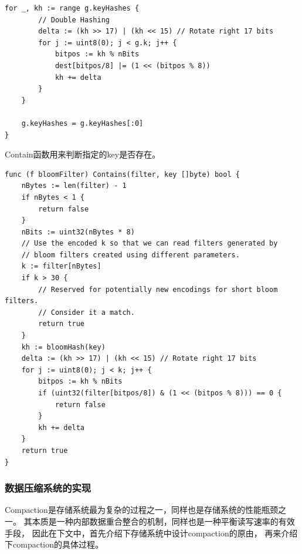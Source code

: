 \begin{enumerate}
\begin{lstlisting}[caption=Generate , label=code_radds_storage_Generate]
	for _, kh := range g.keyHashes {
		// Double Hashing
		delta := (kh >> 17) | (kh << 15) // Rotate right 17 bits
		for j := uint8(0); j < g.k; j++ {
			bitpos := kh % nBits
			dest[bitpos/8] |= (1 << (bitpos % 8))
			kh += delta
		}
	}

	g.keyHashes = g.keyHashes[:0]
}
\end{lstlisting}


Contain函数用来判断指定的key是否存在。

\begin{lstlisting}[caption=tFile , label=code_radds_storage_tfile]
func (f bloomFilter) Contains(filter, key []byte) bool {
	nBytes := len(filter) - 1
	if nBytes < 1 {
	    return false
	}
	nBits := uint32(nBytes * 8)
	// Use the encoded k so that we can read filters generated by
	// bloom filters created using different parameters.
	k := filter[nBytes]
	if k > 30 {
	    // Reserved for potentially new encodings for short bloom filters.
	    // Consider it a match.
	    return true
	}
	kh := bloomHash(key)
	delta := (kh >> 17) | (kh << 15) // Rotate right 17 bits
	for j := uint8(0); j < k; j++ {
	    bitpos := kh % nBits
	    if (uint32(filter[bitpos/8]) & (1 << (bitpos % 8))) == 0 {
	        return false
	    }
	    kh += delta
	}
	return true
}
\end{lstlisting}

		\end{enumerate}

		\subsubsection{数据压缩系统的实现}
		
		Compaction是存储系统最为复杂的过程之一，同样也是存储系统的性能瓶颈之一。
		其本质是一种内部数据重合整合的机制，同样也是一种平衡读写速率的有效手段，
		因此在下文中，首先介绍下存储系统中设计compaction的原由，
		再来介绍下compaction的具体过程。

